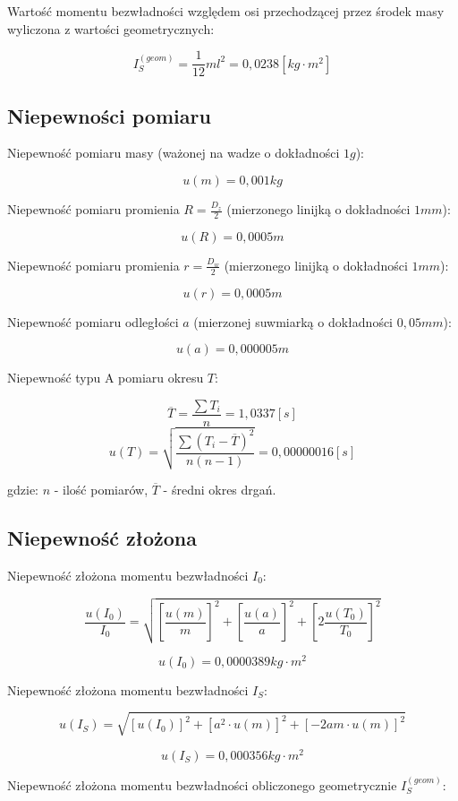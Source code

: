 \documentclass[a4paper,10pt,twoside]{article}
\begin{document}
Wartość momentu bezwładności względem osi przechodzącej przez środek masy wyliczona z wartości geometrycznych:

$$ I_S^{(geom)} = \frac{1}{12}ml^2 = 0,0238 \unit{[kg \cdot m^2]}$$

\subsection{Niepewności pomiaru}

Niepewność pomiaru masy (ważonej na wadze o dokładności $1 \unit{g}$):

$$ u(m) = 0,001 \unit{kg} $$

Niepewność pomiaru promienia $R = \frac{D_z}{2}$ (mierzonego linijką o dokładności $1 \unit{mm}$):

$$ u(R) = 0,0005 \unit{m} $$

Niepewność pomiaru promienia $r = \frac{D_w}{2}$ (mierzonego linijką o dokładności $1 \unit{mm}$):

$$ u(r) = 0,0005 \unit{m} $$

Niepewność pomiaru odległości $a$ (mierzonej suwmiarką o dokładności $0,05 \unit{mm}$):

$$u(a) = 0,000005 \unit{m} $$

Niepewność typu A pomiaru okresu $T$:

$$\overline{T}=\frac{\sum{T_i}}{n}=1,0337 \unit{[s]}$$
$$u(T)=\sqrt{\frac{\sum{(T_i-\overline{T})^2}}{n(n-1)}} = 0,00000016 \unit{[s]}$$

gdzie: $n$ - ilość pomiarów, $\overline{T}$ - średni okres drgań.

\subsection{Niepewność złożona}

Niepewność złożona momentu bezwładności $I_0$:

$$ \frac{u(I_0)}{I_0} = \sqrt{ \left[ \frac{u(m)}{m} \right]^2 + \left[ \frac{u(a)}{a} \right]^2 + \left[ 2 \frac{u(T_0)}{T_0} \right]^2} $$

$$ u(I_0) = 0,0000389 \unit{kg \cdot m^2} $$

Niepewność złożona momentu bezwładności $I_S$:

$$ u(I_S) = \sqrt{ \left[ u(I_0) \right]^2 + \left[ a^2 \cdot u(m) \right]^2 + \left[-2 a m \cdot u(m) \right]^2 } $$

$$ u(I_S) = 0,000356 \unit{kg \cdot m^2} $$


Niepewność złożona momentu bezwładności obliczonego geometrycznie $I_S^{(geom)}$:
\end{document}
